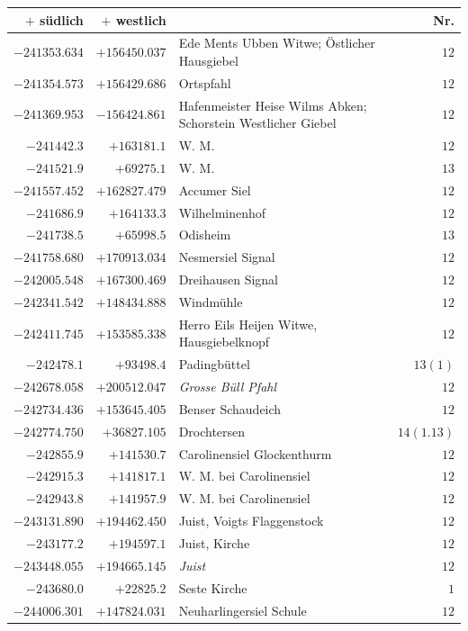 \begin{center}\begingroup\fontsize{8}{9}\selectfont
\setlength{\tabcolsep}{4pt}
\begin{tabular}{r|r|p{170pt}|r}\hline
\(+\) südlich&\(+\) westlich&&Nr.\\\hline
\(-241353.634\)&\(+156450.037\)&Ede Ments Ubben Witwe; Östlicher Hausgiebel&\(12\)\\
\(-241354.573\)&\(+156429.686\)&Ortspfahl&\(12\)\\
\(-241369.953\)&\(-156424.861\)&Hafenmeister Heise Wilms Abken; Schorstein Westlicher Giebel&\(12\)\\
\(-241442.3\)&\(+163181.1\)&W. M.&\(12\)\\
\(-241521.9\)&\(+69275.1\)&W. M.&\(13\)\\
\(-241557.452\)&\(+162827.479\)&Accumer Siel&\(12\)\\
\(-241686.9\)&\(+164133.3\)&Wilhelminenhof&\(12\)\\
\(-241738.5\)&\(+65998.5\)&Odisheim&\(13\)\\
\(-241758.680\)&\(+170913.034\)&Nesmersiel Signal&\(12\)\\
\(-242005.548\)&\(+167300.469\)&Dreihausen Signal&\(12\)\\
\(-242341.542\)&\(+148434.888\)&Windmühle&\(12\)\\
\(-242411.745\)&\(+153585.338\)&Herro Eils Heijen Witwe, Hausgiebelknopf&\(12\)\\
\(-242478.1\)&\(+93498.4\)&Padingbüttel&\(13(1)\)\\
\(-242678.058\)&\(+200512.047\)&\textit{Grosse Büll Pfahl}&\(12\)\\
\(-242734.436\)&\(+153645.405\)&Benser Schaudeich&\(12\)\\
\(-242774.750\)&\(+36827.105\)&Drochtersen&\(14(1.13)\)\\
\(-242855.9\)&\(+141530.7\)&Carolinensiel Glockenthurm&\(12\)\\
\(-242915.3\)&\(+141817.1\)&W. M. bei Carolinensiel&\(12\)\\
\(-242943.8\)&\(+141957.9\)&W. M. bei Carolinensiel&\(12\)\\
\(-243131.890\)&\(+194462.450\)&Juist, Voigts Flaggenstock&\(12\)\\
\(-243177.2\)&\(+194597.1\)&Juist, Kirche&\(12\)\\
\(-243448.055\)&\(+194665.145\)&\textit{Juist}&\(12\)\\
\(-243680.0\)&\(+22825.2\)&Seste Kirche&\(1\)\\
\(-244006.301\)&\(+147824.031\)&Neuharlingersiel Schule&\(12\)\\

\end{tabular}
\end{center}
